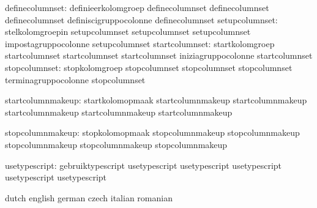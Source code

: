 definecolumnset: definieerkolomgroep        definecolumnset
                 definecolumnset            definecolumnset
                 definiscigruppocolonne     definecolumnset
 setupcolumnset: stelkolomgroepin           setupcolumnset
                 setupcolumnset             setupcolumnset
                 impostagruppocolonne       setupcolumnset
 startcolumnset: startkolomgroep            startcolumnset
                 startcolumnset             startcolumnset
                 iniziagruppocolonne        startcolumnset
  stopcolumnset: stopkolomgroep             stopcolumnset
                 stopcolumnset              stopcolumnset
                 terminagruppocolonne       stopcolumnset

startcolumnmakeup: startkolomopmaak  startcolumnmakeup
                   startcolumnmakeup startcolumnmakeup
                   startcolumnmakeup startcolumnmakeup

 stopcolumnmakeup: stopkolomopmaak   stopcolumnmakeup
                   stopcolumnmakeup  stopcolumnmakeup
                   stopcolumnmakeup  stopcolumnmakeup

  usetypescript: gebruiktypescript          usetypescript
                 usetypescript              usetypescript
                 usetypescript              usetypescript

\stopcommands




\startcommands                    dutch                            english
                                  german                           czech
                                  italian                          romanian

